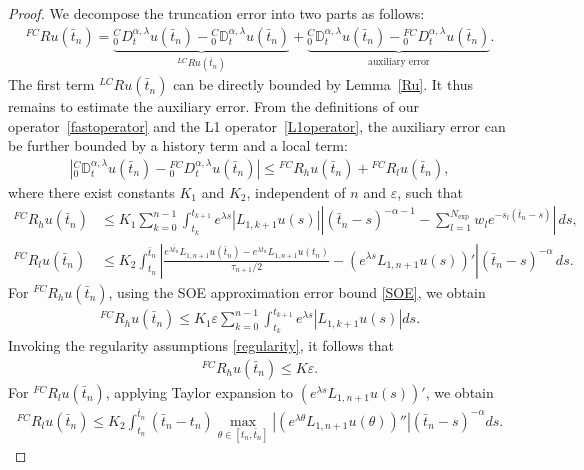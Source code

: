 \documentclass[10pt, reqno]{amsart}
\theoremstyle{remark}
\theoremstyle{definition}
\numberwithin{table}{section}
\begin{document}
\begin{proof}
    We decompose the truncation error into two parts as follows:
    \begin{align*}
        { }^{F C} R u\left(\bar{t}_n\right)=\underbrace{{ }_0^C D_t^{\alpha, \lambda} u\left(\bar{t}_n\right)-{ }_0^C \mathbb{D}_t^{\alpha, \lambda} u\left(\bar{t}_n\right)}_{{ }^{L C} R u\left(\bar{t}_n\right)}+\underbrace{{ }_0^C \mathbb{D}_t^{\alpha, \lambda} u\left(\bar{t}_n\right)-{ }_0^{F C} D_t^{\alpha, \lambda} u\left(\bar{t}_n\right)}_{\text { auxiliary error }} .
    \end{align*}
    The first term ${}^{LC}Ru(\bar{t}_n)$ can be directly bounded by Lemma~\ref{Ru}. It thus remains to estimate the auxiliary error.
From the definitions of our operator~\eqref{fastoperator} and the L1 operator~\eqref{L1operator}, the auxiliary error can be further bounded by a history term and a local term:
\begin{align*}
    |{}^C_0\mathbb{D}_t^{\alpha,  \lambda} u(\bar{t}_n)-{ }_0^{FC}D_t^{\alpha,  \lambda} u(\bar{t}_n)|
\leq  {}^{FC}R_hu(\bar{t}_n)+{}^{FC}R_lu(\bar{t}_n),
\end{align*}
where there exist constants $K_1$ and $K_2$, independent of $n$ and $\varepsilon$, such that
\begin{align*}
{}^{FC}R_h u(\bar{t}_n)
&\le K_1 \sum_{k=0}^{n-1}  
\int_{t_k}^{t_{k+1}} e^{\lambda s}
|L_{1,k+1} u(s)||
(\bar{t}_n - s)^{-\alpha-1}
- \sum_{l=1}^{N_{\mathrm{exp}}} w_l e^{-s_l(\bar{t}_n - s)}| \, ds, \\[1ex]
{}^{FC}R_l u(\bar{t}_n)
&\le K_2 \int_{t_n}^{\bar{t}_n}|
\frac{
e^{\lambda \bar{t}_n} L_{1,n+1} u(\bar{t}_n)
- e^{\lambda t_n} L_{1,n+1} u(t_n)
}{\tau_{n+1}/2}
- ( e^{\lambda s} L_{1,n+1} u(s) )'|
(\bar{t}_n - s)^{-\alpha} \, ds .
\end{align*}
For ${}^{FC}R_h u(\bar{t}_n)$, using the SOE approximation error bound \eqref{SOE}, we obtain
\begin{align}
    {}^{FC}R_h u(\bar{t}_n)\leq K_1 \varepsilon \sum_{k=0}^{n-1}  \int_{t_k}^{t_{k+1}} e^{\lambda s}|L_{1,k+1} u(s)| ds.
\end{align}
Invoking the regularity assumptions \eqref{regularity}, it follows that
\begin{align}
    {}^{FC}R_h u(\bar{t}_n)\leq K\varepsilon.
\end{align}
For ${}^{FC}R_l u(\bar{t}_n)$, applying Taylor expansion to $(e^{\lambda s} L_{1,n+1} u(s))'$, we obtain
\begin{align}
{}^{FC}R_lu(\bar{t}_n)
\leq K_2 \int_{t_{n}}^{\bar{t}_n} (\bar{t}_n-t_n)\max_{\theta\in[t_n, \bar{t}_n]} |(e^{\lambda \theta}L_{1, n+1}u(\theta))''|(\bar{t}_n-s)^{-\alpha}ds.

\end{align}
\end{proof}
\end{document}
